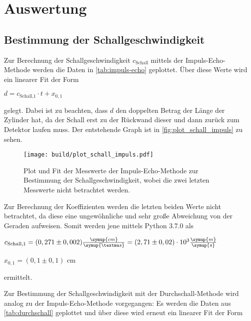 \section{Auswertung}
\label{sec:Auswertung}
\subsection{Bestimmung der Schallgeschwindigkeit}

Zur Berechnung der Schallgeschwindigkeit $c_\text{Schall}$ mittels der Impuls-Echo-Methode werden die Daten in \autoref{tab:impuls-echo} geplottet.
Über diese Werte wird ein linearer Fit der Form

\begin{center}
    $d = c_\text{Schall,1} \cdot t + x_{0,1}$
\end{center}

gelegt. Dabei ist zu beachten, dass $d$ den doppelten Betrag der Länge der Zylinder hat, da der Schall erst zu der Rückwand dieser und dann zurück zum Detektor laufen muss.
Der entstehende Graph ist in \autoref{fig:plot_schall_impuls} zu sehen.



\begin{figure}
    \centering
    \texttt{[image: build/plot\_schall\_impuls.pdf]}
    \caption{Plot und Fit der Messwerte der Impuls-Echo-Methode zur Bestimmung der Schallgeschwindigkeit, wobei die zwei letzten Messwerte nicht betrachtet werden.}
    \label{fig:plot_schall_impuls}
\end{figure}

Zur Berechnung der Koeffizienten werden die letzten beiden Werte nicht betrachtet, da diese eine ungewöhnliche und sehr große Abweichung von der Geraden aufweisen.
Somit werden jene mittels Python 3.7.0 als

\begin{center}
    $c_\text{Schall,1} = (0,271 \pm 0,002) \frac{\symup{cm}}{\symup{µs}} = (2,71 \pm 0,02) \cdot 10^{3} \frac{\symup{m}}{\symup{s}}$
    
    $x_{0,1} = (0,1 \pm 0,1)$ cm
\end{center}

ermittelt.




Zur Bestimmung der Schallgeschwindigkeit mit der Durchschall-Methode wird analog zu der Impuls-Echo-Methode vorgegangen:
Es werden die Daten aus \autoref{tab:durchschall} geplottet und über diese wird erneut ein linearer Fit der Form

